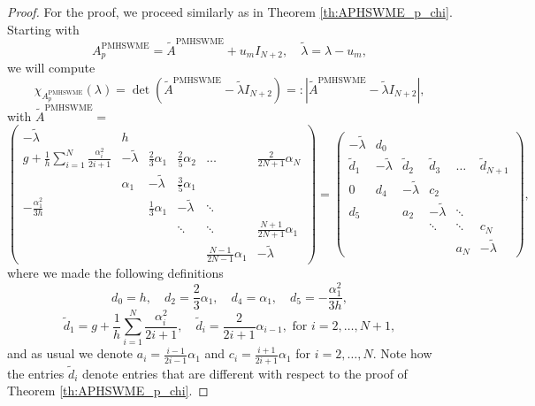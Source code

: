 \documentclass[a4paper, 11pt]{article}
\begin{document}
\begin{proof}
    For the proof, we proceed similarly as in Theorem \ref{th:APHSWME_p_chi}. Starting with
    \begin{equation}
       A^{\textrm{PMHSWME}}_{p} = \widetilde{A}^{{\textrm{PMHSWME}}} + u_m I_{N+2}, \quad \widetilde{\lambda} = \lambda - u_m,
    \end{equation}
    we will compute
    \begin{equation}
       \chi_{A^{\textrm{PMHSWME}}_{p}}(\lambda) = \det\left( \widetilde{A}^{{\textrm{PMHSWME}}} - \widetilde{\lambda} I_{N+2} \right) =: \left| \widetilde{A}^{{\textrm{PMHSWME}}} - \widetilde{\lambda} I_{N+2} \right|,
    \end{equation}
    with $\widetilde{A}^{{\textrm{PMHSWME}}} =$
    \begin{equation}
        \left(\begin{array}{cccccc}
        - \widetilde{\lambda} & h &  &  &  &  \\
        g + \frac{1}{h} \sum\limits_{i=1}^N \frac{\alpha_i^2}{2i+1} & - \widetilde{\lambda} & \frac{2}{3} \alpha_1 & \frac{2}{5} \alpha_2 & \dots & \frac{2}{2N+1} \alpha_N \\
         & \alpha_1 & - \widetilde{\lambda} & \frac{3}{5} \alpha_1 & &\\
        -\frac{\alpha_1^2}{3h} &   & \frac{1}{3}\alpha_1 & - \widetilde{\lambda} & \ddots & \\
         &  &  & \ddots & \ddots & \frac{N+1}{2N+1}\alpha_1 \\
         &  &  &  & \frac{N-1}{2N-1}\alpha_1 & - \widetilde{\lambda}
        \end{array}\right) =
        \left(\begin{array}{cccccc}
        - \widetilde{\lambda} & d_0 &  &  &  &  \\
        \widetilde{d}_{1} & - \widetilde{\lambda} & \widetilde{d}_{2} & \widetilde{d}_{3} & \dots & \widetilde{d}_{{N+1}} \\
        0 & d_4 & - \widetilde{\lambda} & c_2 & &\\
        d_5 &   & a_2 & - \widetilde{\lambda} & \ddots & \\
         &  &  & \ddots & \ddots & c_N \\
         &  &  &  & a_N & - \widetilde{\lambda}
        \end{array}\right),
    \end{equation}
    where we made the following definitions
    \begin{equation}
       d_0 = h, \quad d_2 = \frac{2}{3}\alpha_{1}, \quad d_4 = \alpha_1, \quad d_5 = -\frac{\alpha_1^2}{3h},
    \end{equation}
    \begin{equation}
      \widetilde{d}_{1} = g + \frac{1}{h} \sum\limits_{i=1}^N \frac{\alpha_i^2}{2i+1}, \quad \widetilde{d}_{i} = \frac{2}{2i+1}\alpha_{i-1}, \textrm{ for } i=2,\ldots, N+1,
    \end{equation}
    and as usual we denote $a_i = \frac{i-1}{2i-1}\alpha_1$ and $c_i = \frac{i+1}{2i+1}\alpha_1$ for $i=2,\ldots, N$.
    Note how the entries $\widetilde{d}_{i}$ denote entries that are different with respect to the proof of Theorem \ref{th:APHSWME_p_chi}.


\end{proof}
\end{document}
